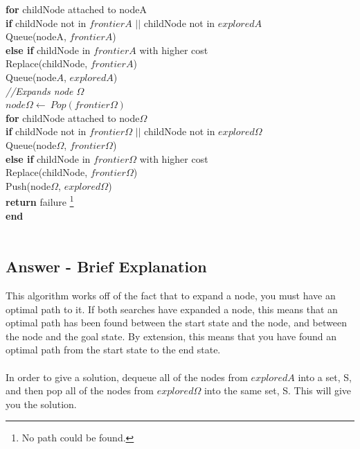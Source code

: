 \documentclass{article}
\begin{document}
\-\hspace{20mm} \textbf{for} childNode attached to nodeA \\
\-\hspace{30mm} \textbf{if} childNode not in $frontierA$ $||$ childNode not in $exploredA$ \\
\-\hspace{40mm} Queue(nodeA, $frontierA$) \\
\-\hspace{30mm} \textbf{else if} childNode in $frontierA$ with higher cost\\
\-\hspace{40mm} Replace(childNode, $frontierA$) \\
\-\hspace{20mm} Queue(node$A$, $exploredA$) \\
\-\hspace{20mm} \textit{//Expands node $\Omega$} \\
\-\hspace{20mm} $node\Omega \leftarrow \ Pop(frontier\Omega)$ \\
\-\hspace{20mm} \textbf{for} childNode attached to node$\Omega$ \\
\-\hspace{30mm} \textbf{if} childNode not in $frontier\Omega$ $||$ childNode not in $explored\Omega$ \\
\-\hspace{40mm} Queue(node$\Omega$, $frontier\Omega$) \\
\-\hspace{30mm} \textbf{else if} childNode in $frontier\Omega$ with higher cost\\
\-\hspace{40mm} Replace(childNode, $frontier\Omega$) \\
\-\hspace{20mm} Push(node$\Omega$, $explored\Omega$) \\
\-\hspace{10mm} \textbf{return} failure \footnote{No path could be found.} \\
\textbf{end}
\\~\\
\newpage
\subsection{Answer - Brief Explanation}
This algorithm works off of the fact that to expand a node, you must have an optimal path to it. If both searches have expanded a node, this means that an optimal path has been found between the start state and the node, and between the node and the goal state. By extension, this means that you have found an optimal path from the start state to the end state.
\\~\\
In order to give a solution, dequeue all of the nodes from $exploredA$ into a set, S, and then pop all of the nodes from $explored\Omega$ into the same set, S. This will give you the solution.
\end{document}
